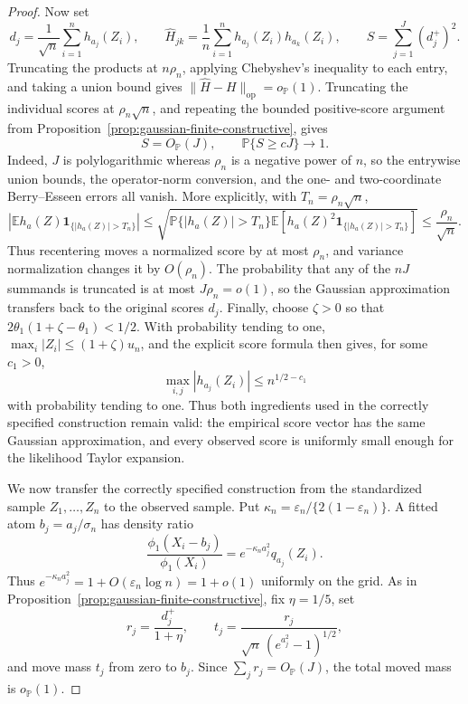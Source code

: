 \documentclass[11pt]{article}
\theoremstyle{definition}
\numberwithin{equation}{section}
\newcommand{\wh}{\widehat}
\newcommand{\eps}{\varepsilon}
\newcommand{\op}{\mathrm{op}}
\begin{document}
\begin{proof}
Now set
\[
    d_j=\frac1{\sqrt n}\sum_{i=1}^nh_{a_j}(Z_i),
    \qquad
    \wh H_{jk}=\frac1n\sum_{i=1}^nh_{a_j}(Z_i)h_{a_k}(Z_i),
    \qquad
    S=\sum_{j=1}^J(d_j^+)^2.
\]
Truncating the products at \(n\rho_n\), applying Chebyshev's inequality to
each entry, and taking a union bound gives
\(\|\wh H-H\|_{\op}=o_{\mathbb P}(1)\). Truncating the individual scores at
\(\rho_n\sqrt n\), and repeating the bounded positive-score argument from
Proposition~\ref{prop:gaussian-finite-constructive}, gives
\[
    S=O_{\mathbb P}(J),
    \qquad
    \mathbb P\{S\ge cJ\}\to1.
\]
Indeed, \(J\) is polylogarithmic whereas \(\rho_n\) is a negative power of
\(n\), so the entrywise union bounds, the operator-norm conversion, and the
one- and two-coordinate Berry--Esseen errors all vanish. More explicitly,
with \(T_n=\rho_n\sqrt n\),
\[
 \left|\mathbb E h_a(Z)\mathbf 1_{\{|h_a(Z)|>T_n\}}\right|
 \le
 \sqrt{\mathbb P\{|h_a(Z)|>T_n\}
       \mathbb E[h_a(Z)^2\mathbf 1_{\{|h_a(Z)|>T_n\}}]}
 \le \frac{\rho_n}{\sqrt n}.
\]
Thus recentering moves a normalized score by at most \(\rho_n\), and
variance normalization changes it by \(O(\rho_n)\). The probability that
any of the \(nJ\) summands is truncated is at most \(J\rho_n=o(1)\), so the
Gaussian approximation transfers back to the original scores \(d_j\).
Finally, choose \(\zeta>0\) so that
\(2\theta_1(1+\zeta-\theta_1)<1/2\). With probability tending to one,
\(\max_i|Z_i|\le(1+\zeta)u_n\), and the explicit score formula then gives,
for some \(c_1>0\),
\[
    \max_{i,j}|h_{a_j}(Z_i)|\le n^{1/2-c_1}
\]
with probability tending to one. Thus both ingredients used in the correctly
specified construction remain valid: the empirical score vector has the same
Gaussian approximation, and every observed score is uniformly small enough
for the likelihood Taylor expansion.

We now transfer the correctly specified construction from the standardized
sample \(Z_1,\ldots,Z_n\) to the observed sample. Put
\(\kappa_n=\eps_n/\{2(1-\eps_n)\}\). A fitted atom
\(b_j=a_j/\sigma_n\) has density ratio
\[
    \frac{\phi_1(X_i-b_j)}{\phi_1(X_i)}
    =e^{-\kappa_na_j^2}q_{a_j}(Z_i).
\]
Thus \(e^{-\kappa_na_j^2}=1+O(\eps_n\log n)=1+o(1)\) uniformly on the
grid. As in Proposition~\ref{prop:gaussian-finite-constructive}, fix
\(\eta=1/5\), set
\[
    r_j=\frac{d_j^+}{1+\eta},
    \qquad
    t_j=\frac{r_j}{\sqrt n\,(e^{a_j^2}-1)^{1/2}},
\]
and move mass \(t_j\) from zero to \(b_j\). Since
\(\sum_jr_j=O_{\mathbb P}(J)\), the total moved mass is
\(o_{\mathbb P}(1)\).


\end{proof}
\end{document}
